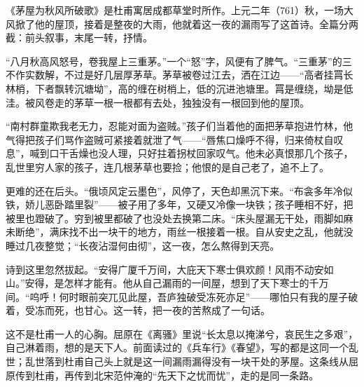 \begin{appreciation}
《茅屋为秋风所破歌》是杜甫寓居成都草堂时所作。上元二年（761）秋，一场大风掀了他的屋顶，接着是整夜的大雨，他就着这一夜的漏雨写了这首诗。全篇分两截：前头叙事，末尾一转，抒情。

“八月秋高风怒号，卷我屋上三重茅。”一个“怒”字，风便有了脾气。“三重茅”的三不作实数解，不过是好几层厚茅草。茅草被卷过江去，洒在江边——“高者挂罥长林梢，下者飘转沉塘坳”，高的缠在树梢上，低的沉进池塘里。罥是缠绕，坳是低洼。被风卷走的茅草一根一根都有去处，独独没有一根回到他的屋顶。

“南村群童欺我老无力，忍能对面为盗贼。”孩子们当着他的面把茅草抱进竹林，他气得把孩子们骂作盗贼可紧接着就泄了气——“唇焦口燥呼不得，归来倚杖自叹息”，喊到口干舌燥也没人理，只好拄着拐杖回家叹气。他未必真恨那几个孩子，乱世里穷人家的孩子，连几根茅草也要捡；他恨的是自己老了，追不上了。

更难的还在后头。“俄顷风定云墨色”，风停了，天色却黑沉下来。“布衾多年冷似铁，娇儿恶卧踏里裂”——被子用了多年，又硬又冷像一块铁；孩子睡相不好，把被里也蹬破了。穷到被里都破了也没处去换第二床。“床头屋漏无干处，雨脚如麻未断绝”，满床找不出一块干的地方，雨丝一根接着一根。自从安史之乱，他就没睡过几夜整觉；“长夜沾湿何由彻”，这一夜，怎么熬得到天亮。

诗到这里忽然拔起。“安得广厦千万间，大庇天下寒士俱欢颜！风雨不动安如山。”安得，是怎样才能有。他从自己漏雨的一间屋，想到了天下寒士的千万间。“呜呼！何时眼前突兀见此屋，吾庐独破受冻死亦足”——哪怕只有我的屋子破着，受冻而死，也甘心。这一转，把一夜的苦熬成了一句话。

这不是杜甫一人的心胸。屈原在《离骚》里说“长太息以掩涕兮，哀民生之多艰”，自己淋着雨，想的是天下人。前面读过的《兵车行》《春望》，写的都是这同一个乱世；乱世落到杜甫自己头上就是这一间漏雨漏得没有一块干处的茅屋。这条线从屈原传到杜甫，再传到北宋范仲淹的“先天下之忧而忧”，走的是同一条路。
\end{appreciation}
